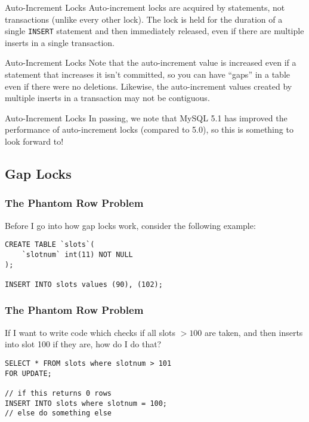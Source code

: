 \documentclass[14pt]{beamer}
\begin{document}
\begin{frame}{Auto-Increment Locks}
  Auto-increment locks are acquired by statements, not transactions (unlike
  every other lock).
  \newline
  \newline
  The lock is held for the duration of a single \texttt{INSERT} statement and
  then immediately released, even if there are multiple inserts in a single
  transaction.
\end{frame}

\begin{frame}{Auto-Increment Locks}
  Note that the auto-increment value is increased even if a statement that
  increases it isn't committed, so you can have ``gaps'' in a table even if
  there were no deletions.
  \newline
  \newline
  \pause
  Likewise, the auto-increment values created by multiple inserts in a
  transaction may not be contiguous.
\end{frame}

\begin{frame}{Auto-Increment Locks}
  In passing, we note that MySQL 5.1 has improved the performance of
  auto-increment locks (compared to 5.0), so this is something to look forward
  to!
\end{frame}

\subsection{Gap Locks}
\begin{frame}[fragile]
  \frametitle{The Phantom Row Problem}
  Before I go into how gap locks work, consider the following example:
  \begin{verbatim}
CREATE TABLE `slots`(
    `slotnum` int(11) NOT NULL
);

INSERT INTO slots values (90), (102);
  \end{verbatim}
\end{frame}

\begin{frame}[fragile]
  \frametitle{The Phantom Row Problem}
  If I want to write code which checks if all slots $>100$ are taken, and then
  inserts into slot 100 if they are, how do I do that?
  \begin{verbatim}
SELECT * FROM slots where slotnum > 101
FOR UPDATE;

// if this returns 0 rows
INSERT INTO slots where slotnum = 100;
// else do something else
  \end{verbatim}
\end{frame}
\end{document}
